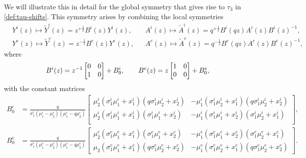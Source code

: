 \documentclass[a4paper,reqno,11pt]{amsart}
\numberwithin{equation}{section}
\numberwithin{figure}{section}
\theoremstyle{plain}
\theoremstyle{remark}
\numberwithin{rhp}{section}
\begin{document}
We will illustrate this in detail for the global symmetry that gives rise to $\tau_3$ in \eqref{def:tau-shifts}. This symmetry arises by combining the local symmetries
\begin{align*}
    &Y^i(z)\mapsto \widetilde{Y}^i(z)=z^{+\frac{1}{2}}B^i(z)Y^i(z), &
    &A^i(z)\mapsto \widetilde{A}^i(z)=q^{+\frac{1}{2}}B^i(qz)A^i(z)B^i(z)^{-1},\\
    &Y^e(z)\mapsto \widetilde{Y}^e(z)=z^{-\frac{1}{2}}B^e(z)Y^e(z), &
    &A^e(z)\mapsto \widetilde{A}^e(z)=q^{-\frac{1}{2}}B^e(qz)A^e(z)B^e(z)^{-1},
\end{align*}
where
\begin{equation*}
    B^i(z)=z^{-1}\begin{bmatrix}
        0 & 0\\
        1 & 0
    \end{bmatrix}+B_0^i,\qquad
      B^e(z)=z\begin{bmatrix}
        1 & 0\\
        0 & 0
    \end{bmatrix}+B_0^e,\\  
\end{equation*}
with the constant matrices
\begin{align*}
    B_0^i&=\frac{q}{\sigma _1^i\left(\mu _1^i-\mu _2^i\right)  \left(\mu _1^i-q\mu _2^i\right)}\begin{bmatrix}
 \mu _2^i  \left(\sigma _1^i\mu _1^i +x_1^i\right) \left(q\sigma _1^i\mu _2^i  +x_2^i\right) & -\mu _1^i  \left(\sigma _1^i\mu _2^i +x_1^i\right) \left(q\sigma _1^i\mu _2^i  +x_2^i\right) \\
 \mu _2^i  \left(\sigma _1^i\mu _1^i +x_1^i\right) \left( \sigma _1^i\mu _1^i+x_2^i\right) & -\mu _1^i  \left(\sigma _1^i\mu _1^i +x_2^i\right) \left(\sigma _1^i\mu _2^i +x_1^i\right) \\
\end{bmatrix},\\
    B_0^e&=\frac{q}{\sigma _1^e\left(\mu _1^e-\mu _2^e\right)  \left(\mu _1^e-q\mu _2^e\right)}\begin{bmatrix}
 \mu _2^e \left(\sigma _1^e\mu _1^e +x_1^e\right) \left(\sigma _1^e\mu _1^e +x_2^e\right) & -\mu _1^e \left(\sigma _1^e\mu _1^e +x_2^e\right) \left(\sigma _1^e\mu _2^e +x_1^e\right) \\
 \mu _2 \left(\sigma _1^e\mu _1^e +x_1^e\right) \left(q \sigma _1^e\mu _2^e +x_2^e\right) & -\mu _1^e \left(\sigma _1^e\mu _2^e +x_1^e\right) \left(q \sigma _1^e\mu _2^e +x_2^e\right) 
\end{bmatrix}.
\end{align*}
\end{document}
